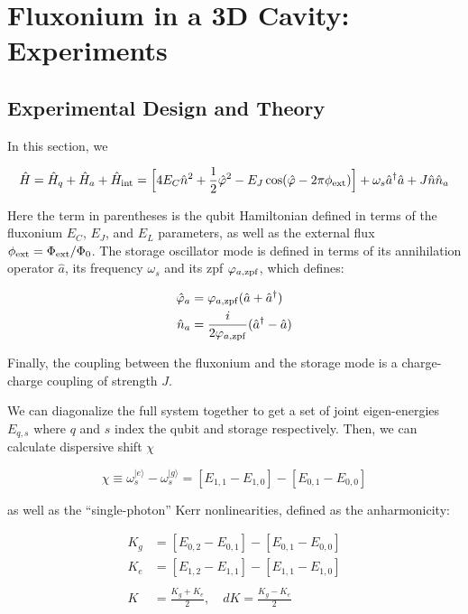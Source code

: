 \chapter{Fluxonium in a 3D Cavity: Experiments\label{ch:4_3DGKP}}

\section{Experimental Design and Theory \label{sec:4_3D_Experiment_Design_Theory}}

In this section, we 

$$
\hat{H} = \hat{H}_q + \hat{H}_a + \hat{H}_{\rm int} = \Big[4E_C \hat{n}^2 + \frac{1}{2}\hat{\varphi}^2 - E_J\cos(\hat{\varphi}-2\pi\phi_{\rm ext})\Big] + \omega_s \hat{a}^\dagger \hat{a} + J \hat{n}\hat{n}_a
$$

Here the term in parentheses is the qubit Hamiltonian defined in terms of the fluxonium $E_C$, $E_J$, and $E_L$ parameters, as well as the external flux $\phi_{\rm ext} = \Phi_{\rm ext}/\Phi_0$. The storage oscillator mode is defined in terms of its annihilation operator $\hat{a}$, its frequency $\omega_s$ and its zpf $\varphi_{a, \rm zpf}$, which defines:

\begin{align*}
\hat{\varphi}_a &= \varphi_{a, \rm zpf} (\hat{a}+\hat{a}^\dagger) \\
\hat{n}_a &= \frac{i}{2\varphi_{a, \rm zpf}} (\hat{a}^\dagger - \hat{a})
\end{align*}

Finally, the coupling between the fluxonium and the storage mode is a charge-charge coupling of strength $J$.

We can diagonalize the full system together to get a set of joint eigen-energies $E_{q, s}$ where $q$ and $s$ index the qubit and storage respectively. Then, we can calculate dispersive shift $\chi$

$$
\chi \equiv \omega_s^{|e\rangle} - \omega_s^{|g\rangle} = [E_{1,1} - E_{1, 0}] - [E_{0, 1} - E_{0, 0}] 
$$

as well as the “single-photon” Kerr nonlinearities, defined as the anharmonicity:

\begin{align*}
K_g &= [E_{0, 2} - E_{0, 1}] - [E_{0, 1} - E_{0, 0}] \\
K_e &= [E_{1, 2} - E_{1, 1}] - [E_{1, 1} - E_{1, 0}]
\\ \\
K &= \frac{K_g + K_e}{2}, \quad dK = \frac{K_g - K_e}{2}
\end{align*}

